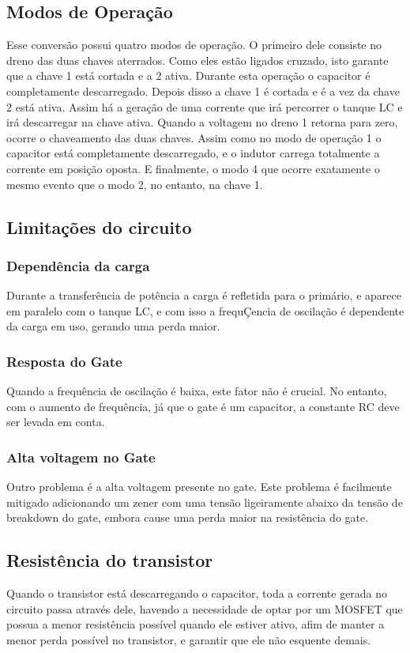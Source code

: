 \subsection{Modos de Operação}
Esse conversão possui quatro modos de operação. O primeiro dele consiste no dreno das duas chaves aterrados. Como eles estão ligados cruzado, isto garante que a chave 1 está cortada e a 2 ativa. Durante esta operação o capacitor é completamente descarregado. Depois disso a chave 1 é cortada e é a vez da chave 2 está ativa. Assim há a geração de uma corrente que irá percorrer o tanque LC e irá descarregar na chave ativa. Quando a voltagem no dreno 1 retorna para zero, ocorre o chaveamento das duas chaves. Assim como no modo de operação 1 o capacitor está completamente descarregado, e o indutor carrega totalmente a corrente em posição oposta. E finalmente, o modo 4 que ocorre exatamente o mesmo evento que o modo 2, no entanto, na chave 1.

\subsection{Limitações do circuito}

\subsubsection{Dependência da carga}
Durante a transferência de potência a carga é refletida para o primário, e aparece em paralelo com o tanque LC, e com isso a frequÇencia de oscilação é dependente da carga em uso, gerando uma perda maior.
\subsubsection{Resposta do Gate}
Quando a frequência de oscilação é baixa, este fator não é crucial. No entanto, com o aumento de frequência, já que o gate é um capacitor, a constante RC deve ser levada em conta.

\subsubsection{Alta voltagem no Gate}
Outro problema é a alta voltagem presente no gate. Este problema é facilmente mitigado adicionando um zener com uma tensão ligeiramente abaixo da tensão de breakdown do gate, embora cause uma perda maior na resistência do gate.

\subsection{Resistência do transistor}
Quando o transistor está descarregando o capacitor, toda a corrente gerada no circuito passa através dele, havendo a necessidade de optar por um MOSFET que possua a menor resistência possível quando ele estiver ativo, afim de manter a menor perda possível no transistor, e garantir que ele não esquente demais.